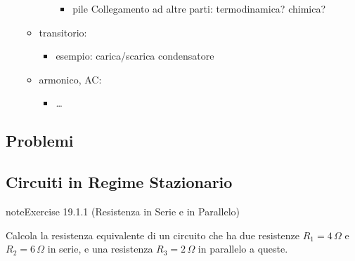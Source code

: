 \documentclass[letterpaper,10pt,italian]{jupyterBook}
\begin{document}
\begin{itemize}
\begin{itemize}
\begin{itemize}
\begin{itemize}
\item {} 
\sphinxAtStartPar
pile  Collegamento ad altre parti: termodinamica? chimica?

\end{itemize}

\end{itemize}

\item {} 
\sphinxAtStartPar
transitorio:
\begin{itemize}
\item {} 
\sphinxAtStartPar
esempio: carica/scarica condensatore

\end{itemize}

\item {} 
\sphinxAtStartPar
armonico, AC:
\begin{itemize}
\item {} 
\sphinxAtStartPar
…

\end{itemize}

\end{itemize}

\end{itemize}

\sphinxstepscope


\subsection{Problemi}
\label{\detokenize{ch/electromagnetism/circuits-electric-problems:problemi}}\label{\detokenize{ch/electromagnetism/circuits-electric-problems:physics-hs-electromagnetism-circuits-electric-problems}}\label{\detokenize{ch/electromagnetism/circuits-electric-problems::doc}}

\subsection{Circuiti in Regime Stazionario}
\label{\detokenize{ch/electromagnetism/circuits-electric-problems:circuiti-in-regime-stazionario}} \label{exercise:ch/electromagnetism/circuits-electric-problems-exercise-0}

\begin{sphinxadmonition}{note}{Exercise 19.1.1 (Resistenza in Serie e in Parallelo)}



\sphinxAtStartPar
Calcola la resistenza equivalente di un circuito che ha due resistenze \(R_1 = 4 \, \Omega\) e \(R_2 = 6 \, \Omega\) in serie, e una resistenza \(R_3 = 2 \, \Omega\) in parallelo a queste.
\end{sphinxadmonition}
 \label{exercise:ch/electromagnetism/circuits-electric-problems-exercise-1}
\end{document}

